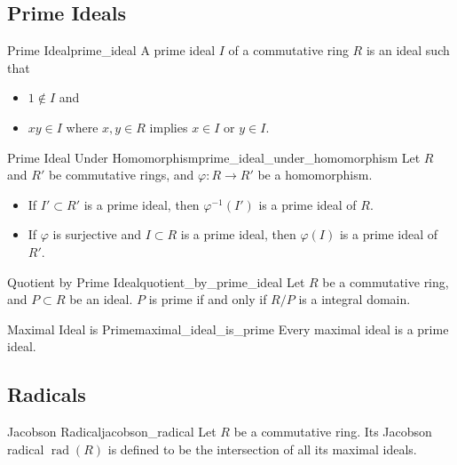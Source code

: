 \documentclass{article}
\begin{document}
\subsection{Prime Ideals}

\begin{definition}{Prime Ideal}{prime_ideal}
    A prime ideal $I$ of a commutative ring $R$ is an ideal such that 
    \begin{itemize}
        \item $1\notin I$ and
        \item $xy \in I$ where $x,y\in R$ implies $x\in I$ or $y\in I$.
    \end{itemize}
\end{definition}

\begin{proposition}{Prime Ideal Under Homomorphism}{prime_ideal_under_homomorphism}
    Let $R$ and $R'$ be commutative rings, and $\varphi: R\rightarrow R'$ be a homomorphism.
    \begin{itemize}
        \item If $I'\subset R'$ is a prime ideal, then $\varphi^{-1}(I')$ is a prime ideal of $R$.
        \item If $\varphi$ is surjective and $I\subset R$ is a prime ideal, then $\varphi(I)$ is a prime ideal of $R'$.
    \end{itemize}
\end{proposition}

\begin{corollary}{Quotient by Prime Ideal}{quotient_by_prime_ideal}
    Let $R$ be a commutative ring, and $P\subset R$ be an ideal.
    $P$ is prime if and only if $R/P$ is a integral domain.
\end{corollary}

\begin{corollary}{Maximal Ideal is Prime}{maximal_ideal_is_prime}
    Every maximal ideal is a prime ideal.
\end{corollary}

\subsection{Radicals}

\begin{definition}{Jacobson Radical}{jacobson_radical}
    Let $R$ be a commutative ring.
    Its Jacobson radical $\operatorname{rad}(R)$ is defined to be the intersection of all its maximal ideals.
\end{definition}
\end{document}
